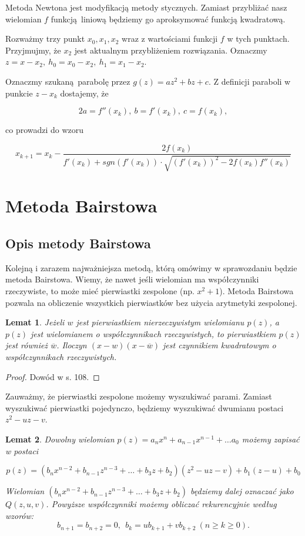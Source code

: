 \documentclass{article}
\newtheorem{lemat}{Lemat}
\begin{document}
Metoda Newtona jest modyfikacją metody stycznych. Zamiast przybliżać nasz wielomian $f$ funkcją liniową będziemy go aproksymować funkcją kwadratową.

Rozważmy trzy punkt $x_0, x_1, x_2$ wraz z wartościami funkcji $f$ w tych punktach. Przyjmujmy, że $x_2$ jest aktualnym przybliżeniem rozwiązania. Oznaczmy $z = x-x_2, \ h_0 = x_0 - x_2, \ h_1 = x_1-x_2$.

Oznaczmy szukaną parabolę przez $g(z) = az^2 + bz + c$. Z definicji paraboli w punkcie $z - x_k$ dostajemy, że 

$$2a = f''(x_k), \ b = f'(x_k), \ c = f(x_k),$$

co prowadzi do wzoru

$$x_{k+1} = x_k - \frac{2f(x_k)}{f'(x_k) + sgn(f'(x_k)) \cdot \sqrt{(f'(x_k))^2 - 2f(x_k)f''(x_k)}}$$


\section{Metoda Bairstowa}

\subsection{Opis metody Bairstowa}

Kolejną i zarazem najważniejsza metodą, którą omówimy w sprawozdaniu będzie metoda Bairstowa. Wiemy, że nawet jeśli wielomian ma współczynniki rzeczywiste, to może mieć pierwiastki zespolone (np. $x^2 + 1$). Metoda Bairstowa pozwala na obliczenie wszystkich pierwiastków bez użycia arytmetyki zespolonej.


\begin{lemat}
Jeżeli $w$ jest pierwiastkiem nierzeczywistym wielomianu $p(z)$, a $p(z)$ jest wielomianem o współczynnikach rzeczywistych, to pierwiastkiem $p(z)$ jest również $\overline{w}$. Iloczyn $(x-w)(x-\overline{w})$ jest czynnikiem kwadratowym o współczynnikach rzeczywistych.
\end{lemat}

\begin{proof}
Dowód w \cite{kincaid} s. 108.	
\end{proof}

Zauważmy, że pierwiastki zespolone możemy wyszukiwać parami. Zamiast wyszukiwać pierwiastki pojedynczo, będziemy wyszukiwać dwumianu postaci $z^2 - uz - v$.

\begin{lemat}
Dowolny wielomian $p(z) = a_nx^n  + a_{n-1}x^{n-1} + \ldots a_0$ możemy zapisać w postaci 

$$p(z) = \left(b_nx^{n-2} + b_{n-1}z^{n-3} + \ldots + b_3 z + b_2 \right) \left( z^2 - uz - v \right) + b_1(z-u) + b_0 $$	

Wielomian $ \left(b_nx^{n-2} + b_{n-1}z^{n-3} + \ldots + b_3 z + b_2 \right) $ będziemy dalej oznaczać jako $Q(z, u, v)$.
Powyższe współczynniki możemy obliczać rekurencyjnie według wzorów:
$$b_{n+1} = b_{n+2} = 0, \ \ b_k = ub_{k+1} + vb_{k+2} \ (n \geq k \geq 0).$$

\end{lemat}
\end{document}
